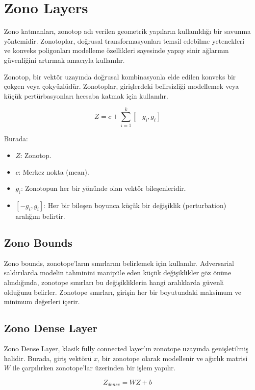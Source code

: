 \section{Zono Layers}

Zono katmanları, zonotop adı verilen geometrik yapıların kullanıldığı bir savunma yöntemidir. Zonotoplar, doğrusal transformasyonları temsil edebilme yetenekleri ve konveks poligonları modelleme özellikleri sayesinde yapay sinir ağlarının güvenliğini artırmak amacıyla kullanılır.

Zonotop, bir vektör uzayında doğrusal kombinasyonla elde edilen konveks bir çokgen veya çokyüzlüdür. Zonotoplar, girişlerdeki belirsizliği modellemek veya küçük pertürbasyonları heesaba katmak için kullanılır.

\[ Z = c + \sum_{i=1}^{k} [-g_i, g_i] \]

Burada:

\begin{itemize}
    \item $Z$: Zonotop.
    \item $c$: Merkez nokta (mean).
    \item $g_i$: Zonotopun her bir yönünde olan vektör bileşenleridir.
    \item $[-g_i, g_i]$: Her bir bileşen boyunca küçük bir değişiklik (perturbation) aralığını belirtir.
\end{itemize}

\subsection{Zono Bounds}

Zono bounds, zonotope'ların sınırlarını belirlemek için kullanılır. Adversarial saldırılarda modelin tahminini manipüle eden küçük değişiklikler göz önüne alındığında, zonotope sınırları bu değişikliklerin hangi aralıklarda güvenli olduğunu belirler. Zonotope sınırları, girişin her bir boyutundaki maksimum ve minimum değerleri içerir.

\subsection{Zono Dense Layer}

Zono Dense Layer, klasik fully connected layer'ın zonotope uzayında genişletilmiş halidir. Burada, giriş vektörü $x$, bir zonotope olarak modellenir ve ağırlık matrisi $W$ ile çarpılırken zonotope'lar üzerinden bir işlem yapılır. 

\[ Z_{dense} = W Z + b \]


